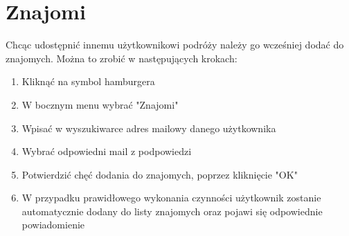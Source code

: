 \documentclass[10pt,twoside,a4paper]{report}
\begin{document}
\section{Znajomi}
Chcąc udostępnić innemu użytkownikowi podróży należy go wcześniej dodać do znajomych. Można to zrobić w następujących krokach:
\begin{enumerate}
\item Kliknąć na symbol hamburgera
\item W bocznym menu wybrać "Znajomi"
\item Wpisać w wyszukiwarce adres mailowy danego użytkownika
\item Wybrać odpowiedni mail z podpowiedzi
\item Potwierdzić chęć dodania do znajomych, poprzez kliknięcie "OK"
\item W przypadku prawidłowego wykonania czynności użytkownik zostanie automatycznie dodany do listy znajomych oraz pojawi się odpowiednie powiadomienie
\end{enumerate}
\end{document}
